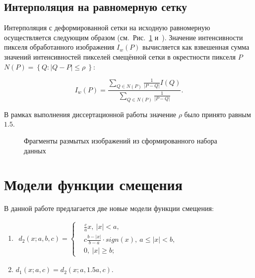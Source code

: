 \subsection{Интерполяция на равномерную сетку}

Интерполяция с деформированной сетки на исходную равномерную осуществляется следующим образом (см.~Рис.~\ref{fig:warping-interpolation} и~\cite{krylov2014gridwarping}). Значение интенсивности пикселя обработанного изображения $I_w(P)$ вычисляется как взвешенная сумма значений интенсивностей пикселей смещённой сетки в окрестности пикселя $P$ $N\left(P\right) = \left\{ Q: \lvert Q - P \rvert \leq \rho\ \right\}$:

\begin{equation*}
	I_w(P)=\frac{\sum_{Q \in N\left(P\right)} \frac{1}{\lvert P - Q \rvert} I(Q)}{\sum_{Q \in N\left(P\right)} \frac{1}{\lvert P - Q \rvert}}.
\end{equation*}

В рамках выполнения диссертационной работы значение $\rho$ было принято равным $1.5$.

\begin{figure}[ht]
	\caption{Фрагменты размытых изображений из сформированного набора данных}
	\label{fig:warping-interpolation}
\end{figure}


\section{Модели функции смещения}

В данной работе предлагается две новые модели функции смещения:

\begin{enumerate}[beginpenalty=10000]	
	\item
	$
	\begin{aligned}
		d_2\left(x; a, b, c\right)=\left\{
		\begin{aligned}
			&\frac{c}{a}x,\ \left|x\right|<a,\\
			&c\frac{b-\left|x\right|}{b-a} \cdot sign\left(x\right),\ a\le\left|x\right|<b,\\
			&0,\ \left|x\right|\geq b;
		\end{aligned}
		\right.
	\end{aligned}
	$
	
	\item $d_1\left(x; a, c\right) = d_2\left(x; a, 1.5a, c\right)$.
\end{enumerate}

